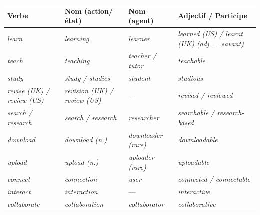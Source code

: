 \documentclass[11pt]{article}
\newcommand{\eng}[1]{\ifmmode\text{\textit{#1}}\else\begingroup\selectlanguage{english}\itshape #1\endgroup\fi}
\begin{document}
\begin{center}
\begin{tabular}{|l|l|l|l|}
\hline
\rowcolor{poppurpleL} \textbf{Verbe} & \textbf{Nom (action/état)} & \textbf{Nom (agent)} & \textbf{Adjectif / Participe} \\
\hline
\eng{learn} & \eng{learning} & \eng{learner} & \eng{learned} (US) / \eng{learnt} (UK) (adj. = savant) \\
\eng{teach} & \eng{teaching} & \eng{teacher} / \eng{tutor} & \eng{teachable} \\
\eng{study} & \eng{study} / \eng{studies} & \eng{student} & \eng{studious} \\
\eng{revise} (UK) / \eng{review} (US) & \eng{revision} (UK) / \eng{review} (US) & — & \eng{revised} / \eng{reviewed} \\
\eng{search} / \eng{research} & \eng{search} / \eng{research} & \eng{researcher} & \eng{searchable} / \eng{research-based} \\
\eng{download} & \eng{download} (n.) & \eng{downloader} (rare) & \eng{downloadable} \\
\eng{upload} & \eng{upload} (n.) & \eng{uploader} (rare) & \eng{uploadable} \\
\eng{connect} & \eng{connection} & \eng{user} & \eng{connected} / \eng{connectable} \\
\eng{interact} & \eng{interaction} & — & \eng{interactive} \\
\eng{collaborate} & \eng{collaboration} & \eng{collaborator} & \eng{collaborative} \\
\hline
\end{tabular}
\end{center}
\end{document}
